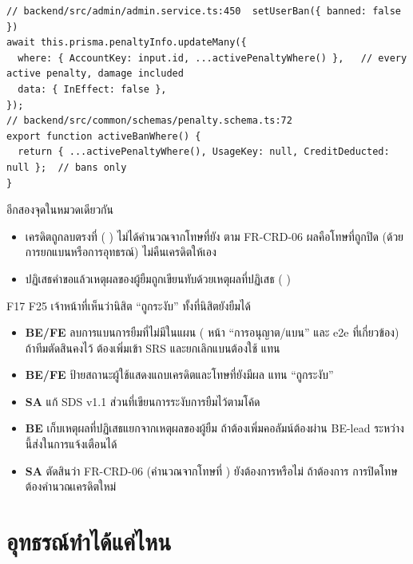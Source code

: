 \begin{lstlisting}
// backend/src/admin/admin.service.ts:450  setUserBan({ banned: false })
await this.prisma.penaltyInfo.updateMany({
  where: { AccountKey: input.id, ...activePenaltyWhere() },   // every active penalty, damage included
  data: { InEffect: false },
});
// backend/src/common/schemas/penalty.schema.ts:72
export function activeBanWhere() {
  return { ...activePenaltyWhere(), UsageKey: null, CreditDeducted: null };  // bans only
}
\end{lstlisting}

อีกสองจุดในหมวดเดียวกัน
\begin{itemize}
\item เครดิตถูกลบตรงที่  ( ) ไม่ได้คำนวณจากโทษที่ยัง 
      ตาม FR-CRD-06 ผลคือโทษที่ถูกปิด (ด้วยการยกแบนหรือการอุทธรณ์) ไม่คืนเครดิตให้เอง
\item ปฏิเสธคำขอแล้วเหตุผลของผู้ยืมถูกเขียนทับด้วยเหตุผลที่ปฏิเสธ ( )
\end{itemize}

F17 \vbad{} \quad F25  เจ้าหน้าที่เห็นว่านิสิต ``ถูกระงับ'' ทั้งที่นิสิตยังยืมได้

\begin{itemize}
\item \textbf{BE/FE} ลบการแบนการยืมที่ไม่มีในแผน (  หน้า ``การอนุญาต/แบน'' และ e2e ที่เกี่ยวข้อง)
      ถ้าทีมตัดสินคงไว้ ต้องเพิ่มเข้า SRS และยกเลิกแบนต้องใช้  แทน 
\item \textbf{BE/FE} ป้ายสถานะผู้ใช้แสดงแถบเครดิตและโทษที่ยังมีผล แทน ``ถูกระงับ''
\item \textbf{SA} แก้ SDS v1.1 ส่วนที่เขียนการระงับการยืมไว้ตามโค้ด
\item \textbf{BE} เก็บเหตุผลที่ปฏิเสธแยกจากเหตุผลของผู้ยืม ถ้าต้องเพิ่มคอลัมน์ต้องผ่าน BE-lead ระหว่างนี้ส่งในการแจ้งเตือนได้
\item \textbf{SA} ตัดสินว่า FR-CRD-06 (คำนวณจากโทษที่ ) ยังต้องการหรือไม่ ถ้าต้องการ การปิดโทษต้องคำนวณเครดิตใหม่
\end{itemize}

\section{อุทธรณ์ทำได้แค่ไหน}
\label{sec:appeal}

